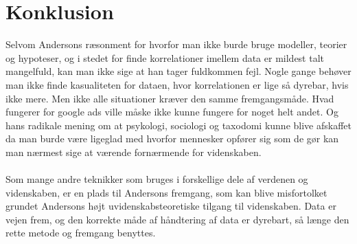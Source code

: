 
\section{Konklusion}
Selvom Andersons ræsonment for hvorfor man ikke burde bruge modeller, 
teorier og hypoteser, og i stedet for finde korrelationer imellem data er 
mildest talt mangelfuld, kan man ikke sige at han tager fuldkommen fejl. 
Nogle gange behøver man ikke finde kasualiteten for dataen, hvor korrelationen 
er lige så dyrebar, hvis ikke mere. Men ikke alle situationer kræver den samme 
fremgangsmåde. Hvad fungerer for google ads ville måske ikke kunne fungere for 
noget helt andet. Og hans radikale mening om at psykologi, sociologi og 
taxodomi kunne blive afskaffet da man burde være ligeglad med hvorfor 
mennesker opfører sig som de gør kan man nærmest sige at værende fornærmende 
for videnskaben.\\\\

Som mange andre teknikker som bruges i forskellige dele af verdenen og videnskaben, 
er en plads til Andersons fremgang, som kan blive misfortolket grundet Andersons højt 
uvidenskabsteoretiske tilgang til videnskaben. Data er vejen frem, og den korrekte 
måde af håndtering af data er dyrebart, så længe den rette metode og fremgang benyttes.




